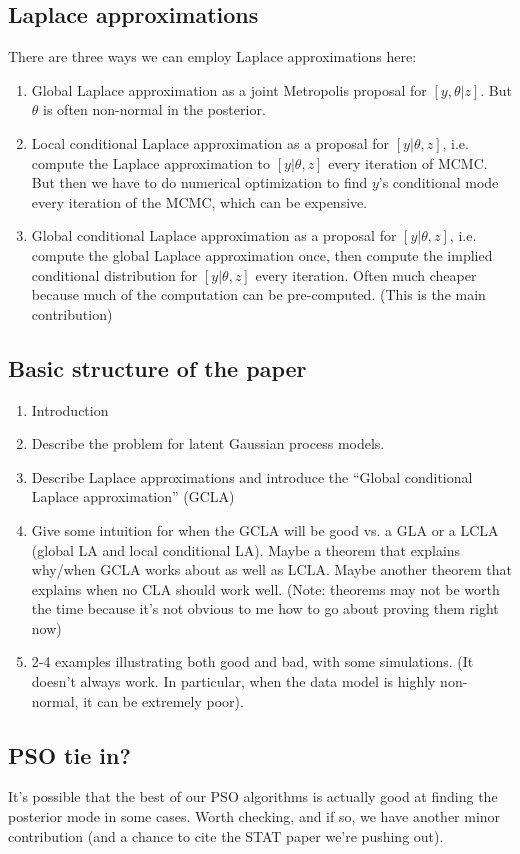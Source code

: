 \documentclass[12pt]{article}
\begin{document}
\subsection{Laplace approximations}
There are three ways we can employ Laplace approximations here:
\begin{enumerate}
\item Global Laplace approximation as a joint Metropolis proposal for $[y,\theta|z]$. But $\theta$ is often non-normal in the posterior.
\item Local conditional Laplace approximation as a proposal for $[y|\theta,z]$, i.e. compute the Laplace approximation to $[y|\theta,z]$ every iteration of MCMC. But then we have to do numerical optimization to find $y$'s conditional mode every iteration of the MCMC, which can be expensive.
\item Global conditional Laplace approximation as a proposal for $[y|\theta,z]$, i.e. compute the global Laplace approximation once, then compute the implied conditional distribution for $[y|\theta,z]$ every iteration. Often much cheaper because much of the computation can be pre-computed. (This is the main contribution)
\end{enumerate}

\subsection{Basic structure of the paper}
\begin{enumerate}
\item Introduction
\item Describe the problem for latent Gaussian process models.
\item Describe Laplace approximations and introduce the ``Global conditional Laplace approximation'' (GCLA)
\item Give some intuition for when the GCLA will be good vs. a GLA or a LCLA (global LA and local conditional LA). Maybe a theorem that explains why/when GCLA works about as well as LCLA. Maybe another theorem that explains when no CLA should work well. (Note: theorems may not be worth the time because it's not obvious to me how to go about proving them right now)
\item 2-4 examples illustrating both good and bad, with some simulations. (It doesn't always work. In particular, when the data model is highly non-normal, it can be extremely poor).
\end{enumerate}

\subsection{PSO tie in?}
It's possible that the best of our PSO algorithms is actually good at finding the posterior mode in some cases. Worth checking, and if so, we have another minor contribution (and a chance to cite the STAT paper we're pushing out).
\end{document}
